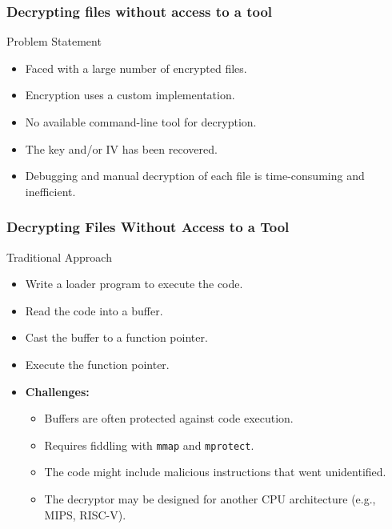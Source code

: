 \begin{frame}
\frametitle{Decrypting files without access to a tool}
\begin{block}{Problem Statement}
    \begin{itemize}
        \item Faced with a large number of encrypted files.
        \item Encryption uses a custom implementation.
        \item No available command-line tool for decryption.
        \item The key and/or IV has been recovered.
        \item Debugging and manual decryption of each file is time-consuming and inefficient.
    \end{itemize}
\end{block}
\end{frame}

\begin{frame}
\frametitle{Decrypting Files Without Access to a Tool}
\begin{block}{Traditional Approach}
\begin{itemize}
    \item Write a loader program to execute the code.
    \item Read the code into a buffer.
    \item Cast the buffer to a function pointer.
    \item Execute the function pointer.
    \item \textbf{Challenges:}
    \begin{itemize}
        \item Buffers are often protected against code execution.
        \item Requires fiddling with \texttt{mmap} and \texttt{mprotect}.
        \item The code might include malicious instructions that went unidentified.
        \item The decryptor may be designed for another CPU architecture (e.g., MIPS, RISC-V).
    \end{itemize}
\end{itemize}
\end{block}
\end{frame}

